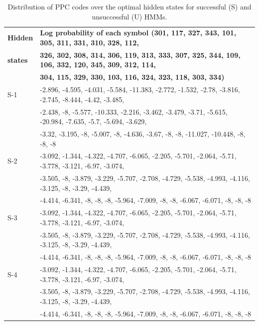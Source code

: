 \documentclass{amia}
\begin{document}
\begin{table}[h]
\centering
\caption{Distribution of PPC codes over the optimal hidden states for successful (S) and unsuccessful (U) HMMs.}
\label{tab:emission_matrix}
  \begin{tabular}{|l|l|}
  \hline
   \textbf{Hidden} & \textbf{Log probability of each symbol (301, 117, 327, 343, 101, 305, 311, 331, 310, 328, 112,} \\ 
   \textbf{states} & \textbf{ 326, 302, 308, 314, 306, 119, 313, 333, 307, 325, 344, 109, 106, 332, 120, 345, 309, 312, 114,} \\
    & \textbf{ 304, 115, 329, 330, 103, 116, 324, 323, 118, 303, 334)} \\\hline      
S-1 & -2.896, -4.595, -4.031, -5.584, -11.383, -2.772, -1.532, -2.78, -3.816, -2.745, -8.444, -4.42, -3.485, \\
& -2.438, -8, -5.577, -10.333, -2.216, -3.462, -3.479, -3.71, -5.615, -20.984, -7.635, -5.7, -5.694, -3.629, \\
& -3.32, -3.195, -8, -5.007, -8, -4.636, -3.67, -8, -8, -11.027, -10.448, -8, -8, -8 \\\hline
S-2 & -3.092, -1.344, -4.322, -4.707, -6.065, -2.205, -5.701, -2.064, -5.71, -3.778, -3.121, -6.97, -3.074, \\
& -3.505, -8, -3.879, -3.229, -5.707, -2.708, -4.729, -5.538, -4.993, -4.116, -3.125, -8, -3.29, -4.439, \\
& -4.414, -6.341, -8, -8, -8, -5.964, -7.009, -8, -8, -6.067, -6.071, -8, -8, -8 \\\hline
S-3 & -3.092, -1.344, -4.322, -4.707, -6.065, -2.205, -5.701, -2.064, -5.71, -3.778, -3.121, -6.97, -3.074, \\
& -3.505, -8, -3.879, -3.229, -5.707, -2.708, -4.729, -5.538, -4.993, -4.116, -3.125, -8, -3.29, -4.439, \\
& -4.414, -6.341, -8, -8, -8, -5.964, -7.009, -8, -8, -6.067, -6.071, -8, -8, -8 \\\hline
S-4 & -3.092, -1.344, -4.322, -4.707, -6.065, -2.205, -5.701, -2.064, -5.71, -3.778, -3.121, -6.97, -3.074, \\
& -3.505, -8, -3.879, -3.229, -5.707, -2.708, -4.729, -5.538, -4.993, -4.116, -3.125, -8, -3.29, -4.439, \\
& -4.414, -6.341, -8, -8, -8, -5.964, -7.009, -8, -8, -6.067, -6.071, -8, -8, -8 \\\hline


\end{tabular}
\end{table}
\end{document}
